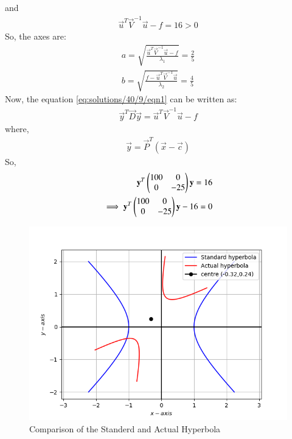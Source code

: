 and 
\begin{align}
\vec{u}^T\vec{V}^{-1}\vec{u}-f=16>0
\end{align}
So, the axes are:
\begin{align}
a=\sqrt{\frac{\vec{u}^T\vec{V}^{-1}\vec{u}-f}{\lambda_1}} = \frac{2}{5}\\
b=\sqrt{\frac{f-\vec{u}^T\vec{V}^{-1}\vec{u}}{\lambda_2}} = \frac{4}{5}
\end{align}
Now, the equation \ref{eq:solutions/40/9/eqn1} can be written as:
\begin{align}
\vec{y}^T\vec{D}\vec{y}=\vec{u}^T\vec{V}^{-1}\vec{u}-f
\end{align}
where, 
\begin{align}
\vec{y}= \vec{P}^T (\vec{x}-\vec{c})
\end{align}
So, 
\begin{align}
\mathbf{y}^T\begin{pmatrix}100 & 0\\0 & -25\end{pmatrix}\mathbf{y}=16\\
\implies \mathbf{y}^T\begin{pmatrix}100 & 0\\0 & -25\end{pmatrix}\mathbf{y}-16=0
\end{align}

\begin{figure}[!ht]
\centering
\includegraphics[width=\columnwidth]{./solutions/40/9/figs/hyperbola_2.png}
\caption{Comparison of the Standerd and Actual Hyperbola}
\label{eq:solutions/40/9/fig:hyperbola}
\end{figure}




